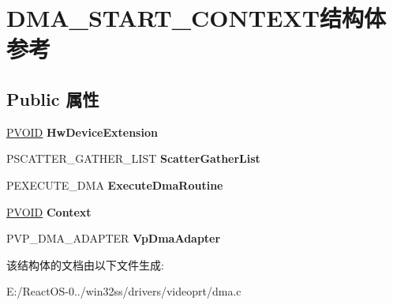 \hypertarget{struct_d_m_a___s_t_a_r_t___c_o_n_t_e_x_t}{}\section{D\+M\+A\+\_\+\+S\+T\+A\+R\+T\+\_\+\+C\+O\+N\+T\+E\+X\+T结构体 参考}
\label{struct_d_m_a___s_t_a_r_t___c_o_n_t_e_x_t}
\subsection*{Public 属性}
\begin{DoxyCompactItemize}
\item 
\mbox{\label{struct_d_m_a___s_t_a_r_t___c_o_n_t_e_x_t_a25c4593e550b39d4db44b0de67fb82ef}} 
\hyperlink{interfacevoid}{P\+V\+O\+ID} {\bfseries Hw\+Device\+Extension}
\item 
\mbox{\label{struct_d_m_a___s_t_a_r_t___c_o_n_t_e_x_t_a7ebb04a4083d971313d36ccacd57a3db}} 
P\+S\+C\+A\+T\+T\+E\+R\+\_\+\+G\+A\+T\+H\+E\+R\+\_\+\+L\+I\+ST {\bfseries Scatter\+Gather\+List}
\item 
\mbox{\label{struct_d_m_a___s_t_a_r_t___c_o_n_t_e_x_t_a7b272f3bc67897f00a74853b33bde996}} 
P\+E\+X\+E\+C\+U\+T\+E\+\_\+\+D\+MA {\bfseries Execute\+Dma\+Routine}
\item 
\mbox{\label{struct_d_m_a___s_t_a_r_t___c_o_n_t_e_x_t_aa12fa84c0bfd59679f922de6d6855928}} 
\hyperlink{interfacevoid}{P\+V\+O\+ID} {\bfseries Context}
\item 
\mbox{\label{struct_d_m_a___s_t_a_r_t___c_o_n_t_e_x_t_a3287ca75e9aacc72db642f248a4f96c1}} 
P\+V\+P\+\_\+\+D\+M\+A\+\_\+\+A\+D\+A\+P\+T\+ER {\bfseries Vp\+Dma\+Adapter}
\end{DoxyCompactItemize}


该结构体的文档由以下文件生成\+:\begin{DoxyCompactItemize}
\item 
E\+:/\+React\+O\+S-\/0../win32ss/drivers/videoprt/dma.\+c\end{DoxyCompactItemize}
